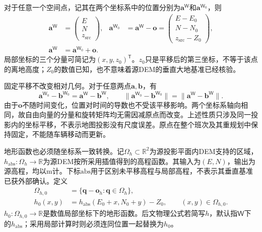 对于任意一个空间点，记其在两个坐标系中的位置分别为$\mathbf a^{\mathsf W}$和$\mathbf a^{\mathsf W_0}$，则
\begin{align}
 \mathbf a^{\mathsf W}
 &=\begin{pmatrix}E\\N\\z_{\mathrm{src}}\end{pmatrix},
 &\mathbf a^{\mathsf W_0}
 &=\mathbf a^{\mathsf W}-\mathbf o
 =\begin{pmatrix}E-E_0\\N-N_0\\z_{\mathrm{src}}-Z_0\end{pmatrix},
 \label{s0403:local_coordinates}\\
 \mathbf a^{\mathsf W}
 &=\mathbf a^{\mathsf W_0}+\mathbf o.
 \label{s0403:world_recovery}
\end{align}
局部坐标的三个分量可简记为$(x,y,z_0)^{\mathsf T}$。$z_0$只是平移后的第三坐标，不等于该点的离地高度；$Z_0$的数值已知，也不意味着源DEM的垂直大地基准已经核验。

固定平移不改变相对几何。对于任意两点$\mathbf a,\mathbf b$，有
\begin{equation}
 \mathbf a^{\mathsf W_0}-\mathbf b^{\mathsf W_0}
 =\mathbf a^{\mathsf W}-\mathbf b^{\mathsf W},
 \qquad
 \|\mathbf a^{\mathsf W_0}-\mathbf b^{\mathsf W_0}\|
 =\|\mathbf a^{\mathsf W}-\mathbf b^{\mathsf W}\|.
 \label{s0403:translation_difference}
\end{equation}
由于$\mathbf o$不随时间变化，位置对时间的导数也不受该平移影响。两个坐标系轴向相同，故自由向量的分量和旋转矩阵均无需因减原点而改变。上述性质只涉及同一投影内的坐标平移，不表示地图投影没有尺度误差。原点在整个班次及其重规划中保持固定，不能随车辆移动而更新。

地形函数也必须随坐标系一致转换。记$\Omega_h\subset\mathbb R^2$为源投影平面内DEM支持的区域，$h_{\mathrm{abs}}:\Omega_h\to\mathbb R$为源DEM按所采用插值得到的高程函数。其输入为$(E,N)$，输出为源高程，均以$\mathrm m$计。下标$\mathrm{abs}$用于区别未平移高程与局部高程，不表示其垂直基准已获外部确认。定义
\begin{align}
 \Omega_{h,0}
 &=\{\mathbf q-\mathbf o_h:\mathbf q\in\Omega_h\},
 \label{s0403:local_terrain_domain}\\
 h_0(x,y)
 &=h_{\mathrm{abs}}(E_0+x,N_0+y)-Z_0,
 \qquad (x,y)\in\Omega_{h,0}.
 \label{s0403:local_terrain}
\end{align}
$h_0:\Omega_{h,0}\to\mathbb R$是数值局部坐标下的地形函数。后文物理公式若简写$h$，默认指$\mathsf W$下的$h_{\mathrm{abs}}$；采用局部计算时则必须连同位置一起替换为$h_0$。

